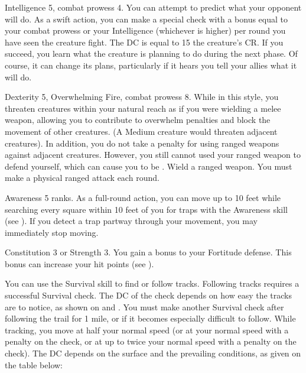\featpres Intelligence 5, combat prowess 4.
\featben You can attempt to predict what your opponent will do.
As a swift action, you can make a special check with a bonus equal to your combat prowess or your Intelligence (whichever is higher)  per round you have seen the creature fight.
The DC is equal to 15 \add the creature's CR.
If you succeed, you learn what the creature is planning to do during the next phase.
Of course, it can change its plans, particularly if it hears you tell your allies what it will do.

\featpres Dexterity 5, Overwhelming Fire, combat prowess 8.
\featben While in this style, you threaten creatures within your natural reach as if you were wielding a melee weapon, allowing you to contribute to overwhelm penalties and block the movement of other creatures.
(A Medium creature would threaten adjacent creatures).
In addition, you do not take a  penalty for using ranged weapons against adjacent creatures.
However, you still cannot used your ranged weapon to defend yourself, which can cause you to be .
\stylereq Wield a ranged weapon.
You must make a physical ranged attack each round.

\featpre Awareness 5 ranks.
\featben As a full-round action, you can move up to 10 feet while searching every square within 10 feet of you for traps with the Awareness skill (see ).
If you detect a trap partway through your movement, you may immediately stop moving.

\featpre Constitution 3 or Strength 3.
\featben You gain a  bonus to your Fortitude defense.
This bonus can increase your hit points (see ).

\featben You can use the Survival skill to find or follow tracks.
Following tracks requires a successful Survival check.
The DC of the check depends on how easy the tracks are to notice, as shown on  and .
You must make another Survival check after following the trail for 1 mile, or if it becomes especially difficult to follow.
While tracking, you move at half your normal speed (or at your normal speed with a  penalty on the check, or at up to twice your normal speed with a  penalty on the check).
The DC depends on the surface and the prevailing conditions, as given on the table below:

